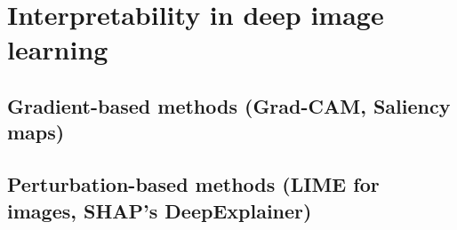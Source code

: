 \chapter{Interpretability in deep image learning}

\section{Gradient-based methods (Grad-CAM, Saliency maps)}
\section{Perturbation-based methods (LIME for images, SHAP's DeepExplainer)}
